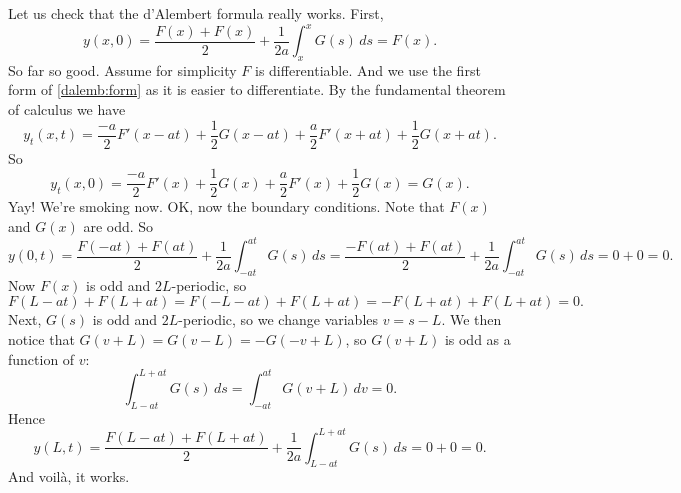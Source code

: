 Let us check that the d'Alembert formula really works.
First,
\begin{equation*}
y(x,0) =
\frac{F(x) + F(x)}{2} + \frac{1}{2a} \int_{x}^{x} G(s) \,ds 
=
F(x) .
\end{equation*}
So far so good.  Assume for simplicity $F$ is differentiable.
And we use the first form of \eqref{dalemb:form} as it is
easier to differentiate.
By the fundamental theorem of calculus we have
\begin{equation*}
y_t(x,t) =
\frac{-a}{2} F'(x-at) + \frac{1}{2} G(x-at)
+
\frac{a}{2} F'(x+at) + \frac{1}{2} G(x+at) .
\end{equation*}
So
\begin{equation*}
y_t(x,0) =
\frac{-a}{2} F'(x) + \frac{1}{2} G(x)
+
\frac{a}{2} F'(x) + \frac{1}{2} G(x) = G(x) .
\end{equation*}
Yay!  We're smoking now.  OK\@, now the boundary conditions.  Note
that $F(x)$ and $G(x)$ are odd.  So
\begin{equation*}
y(0,t)
=
\frac{F(-at) + F(at)}{2} + \frac{1}{2a} \int_{-at}^{at} G(s) \,ds 
=
\frac{-F(at) + F(at)}{2} + \frac{1}{2a} \int_{-at}^{at} G(s) \,ds 
= 0 + 0 = 0.
\end{equation*}
Now $F(x)$ is odd and $2L$-periodic, so
\begin{equation*}
F(L-at)+F(L+at)
= 
F(-L-at)+F(L+at)
=
-F(L+at)+F(L+at)
= 0 .
\end{equation*}
Next, $G(s)$ is odd and $2L$-periodic, so we change
variables $v = s-L$.  We then notice that $G(v+L)=G(v-L)=-G(-v+L)$,
so $G(v+L)$ is odd as a function of $v$:
\begin{equation*}
\int_{L-at}^{L+at}
G(s)\,ds
=
\int_{-at}^{at}
G(v+L)\,dv
=
0 .
\end{equation*}
Hence
\begin{equation*}
y(L,t) =
\frac{F(L-at) + F(L+at)}{2} + \frac{1}{2a} \int_{L-at}^{L+at} G(s) \,ds 
=
0 + 0  = 0.
\end{equation*}
And voil\`a, it works.

